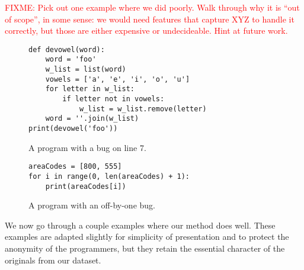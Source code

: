 \documentclass[conference]{IEEEtran}
\newcommand{\fixme}[1]{\textcolor{red}{FIXME: #1}}
\begin{document}
\fixme{
Pick out one example where we did poorly. Walk through why it is ``out of
scope'', in some sense: we would need features that capture XYZ to handle
it correctly, but those are either expensive or undecideable. Hint at
future work.
}

%
%
%
%
%
%

\begin{figure}
\begin{lstlisting}
def devowel(word):
    word = 'foo'
    w_list = list(word)
    vowels = ['a', 'e', 'i', 'o', 'u']
    for letter in w_list:
        if letter not in vowels:
            w_list = w_list.remove(letter)
    word = ''.join(w_list)
print(devowel('foo'))
\end{lstlisting}
\caption{A program with a bug on line 7.}
\label{fig-win-example-one}
\end{figure}


\begin{figure}
\begin{lstlisting}
areaCodes = [800, 555]
for i in range(0, len(areaCodes) + 1):
    print(areaCodes[i])
\end{lstlisting}
\caption{A program with an off-by-one bug.}
\label{fig-win-example-two}
\end{figure}

We now go through a couple examples where our method does well. These examples
are adapted slightly for simplicity of
presentation and to protect the anonymity of the programmers, but they retain
the essential character of the originals from our dataset.
\end{document}
